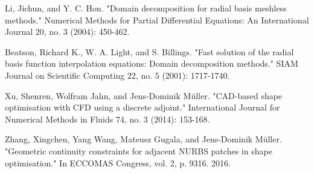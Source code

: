 \documentclass[conference]{IEEEtran}
\begin{document}
\begin{thebibliography}{00}
 Li, Jichun, and Y. C. Hon. "Domain decomposition for radial basis meshless methods." Numerical Methods for Partial Differential Equations: An International Journal 20, no. 3 (2004): 450-462.

 Beatson, Richard K., W. A. Light, and S. Billings. "Fast solution of the radial basis function interpolation equations: Domain decomposition methods." SIAM Journal on Scientific Computing 22, no. 5 (2001): 1717-1740.

 Xu, Shenren, Wolfram Jahn, and Jens‐Dominik Müller. "CAD‐based shape optimisation with CFD using a discrete adjoint." International Journal for Numerical Methods in Fluids 74, no. 3 (2014): 153-168.

 Zhang, Xingchen, Yang Wang, Mateusz Gugala, and Jens-Dominik Müller. "Geometric continuity constraints for adjacent NURBS patches in shape optimisation." In ECCOMAS Congress, vol. 2, p. 9316. 2016.

\end{thebibliography}

\end{document}
